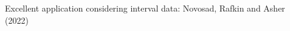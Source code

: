 \documentclass[notes,11pt, aspectratio=169]{beamer}
\begin{document}
\begin{frame}{Excellent application considering interval data: Novosad, Rafkin and Asher (2022)}
\begin{columns}[onlytextwidth, T]
\begin{column}{.5\textwidth}
      \end{column}%
    \end{columns}
\end{frame}
\end{document}
